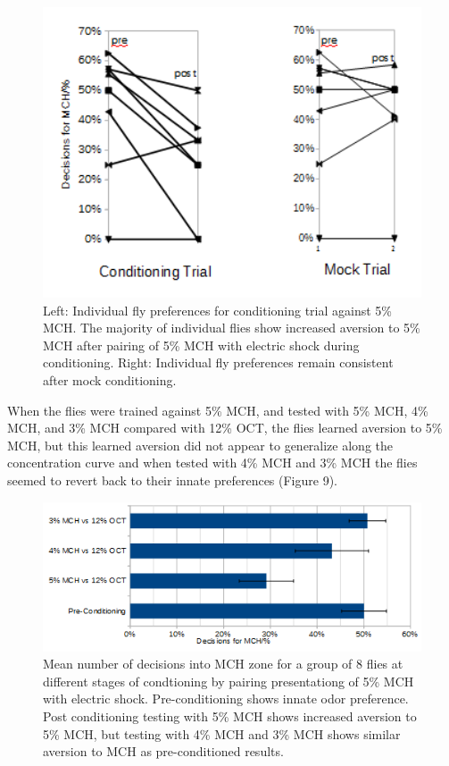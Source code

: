 \documentclass{article}
\begin{document}
\begin{figure}[h]
\begin{center}
\includegraphics[width=1\textwidth]{Figures/individual_conditioning_mock_and_MCH}
\caption{Left: Individual fly preferences for conditioning trial against 5\% MCH. The majority of individual flies show increased aversion to 5\% MCH after pairing of 5\% MCH with electric shock during conditioning. Right: Individual fly preferences remain consistent after mock conditioning.}
\end{center}
\end{figure}

When the flies were trained against 5\% MCH, and tested with 5\% MCH, 4\% MCH, and 3\% MCH compared with 12\% OCT, the flies learned aversion to 5\% MCH, but this learned aversion did not appear to generalize along the concentration curve and when tested with 4\% MCH and 3\% MCH the flies seemed to revert back to their innate preferences (Figure 9).\\

\begin{figure}[h]
\begin{center}
\includegraphics[width=1\textwidth]{Figures/5MCH_down_conc}
\caption{Mean number of decisions into MCH zone for a group of 8 flies at different stages of condtioning by pairing presentationg of 5\% MCH with electric shock. Pre-conditioning shows innate odor preference. Post conditioning testing with 5\% MCH shows increased aversion to 5\% MCH, but testing with 4\% MCH and 3\% MCH shows similar aversion to MCH as pre-conditioned results.}
\end{center}
\end{figure}
\end{document}
